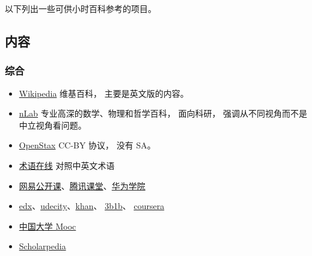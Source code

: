 
以下列出一些可供小时百科参考的项目。

\subsection{内容}
\subsubsection{综合}
\begin{itemize}
\item \href{https://en.wikipedia.org/wiki/Main_Page}{Wikipedia} 维基百科， 主要是英文版的内容。
\item \href{https://ncatlab.org/nlab/show/HomePage}{nLab} 专业高深的数学、物理和哲学百科， 面向科研， 强调从不同视角而不是中立视角看问题。
\item \href{https://openstax.org}{OpenStax} CC-BY 协议， 没有 SA。
\item \href{https://www.termonline.cn/index}{术语在线} 对照中英文术语
\item \href{https://open.163.com}{网易公开课}、\href{https://ke.qq.com}{腾讯课堂}、\href{https://edu.huaweicloud.com}{华为学院}
\item \href{https://www.edx.org}{edx}、\href{https://www.udacity.com}{udecity}、\href{https://www.khanacademy.org}{khan}、 \href{https://www.youtube.com/@3blue1brown}{3b1b}、 \href{https://www.coursera.org}{coursera}
\item \href{https://www.icourse163.org}{中国大学 Mooc}
\item \href{http://www.scholarpedia.org}{Scholarpedia}
\end{itemize}

